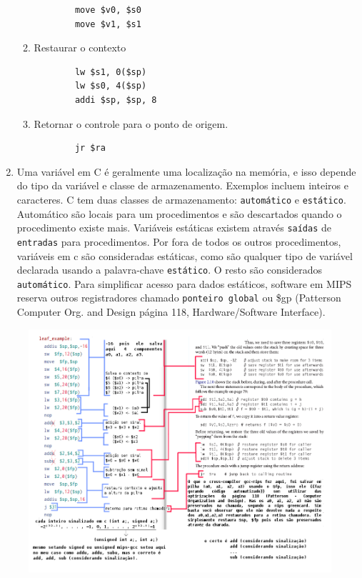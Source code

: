 \documentclass{article}
\begin{document}
\begin{enumerate}
\begin{enumerate}
      \begin{verbatim}
        move $v0, $s0
        move $v1, $s1
      \end{verbatim}

    \item Restaurar o contexto

      \begin{verbatim}
        lw $s1, 0($sp)
        lw $s0, 4($sp)
        addi $sp, $sp, 8
      \end{verbatim}

    \item Retornar o controle para o ponto de origem.

      \begin{verbatim}
        jr $ra
      \end{verbatim}

  \end{enumerate}

  \item Uma variável em C é geralmente uma localização na memória, e isso
  depende do tipo da variável e classe de armazenamento. Exemplos incluem
  inteiros e caracteres. C tem duas classes de armazenamento: \verb|automático|
  e \verb|estático|. Automático são locais para um procedimentos e são
  descartados quando o procedimento existe mais. Variáveis estáticas existem
  através \verb|saídas| de \verb|entradas| para procedimentos. Por fora de
  todos os outros procedimentos, variáveis em c são consideradas estáticas,
  como são qualquer tipo de variável declarada usando a palavra-chave
  \verb|estático|. O resto são considerados \verb|automático|. Para simplificar
  acesso para dados estáticos, software em MIPS reserva outros registradores
  chamado \verb|ponteiro global| ou  \$gp (Patterson Computer Org. and Design
  página 118, Hardware/Software Interface).

\end{enumerate}

\pagebreak
\begin{figure}[ht!]
  \centering
  \includegraphics[width=\linewidth]{leaf_example.png}
\end{figure}
\end{document}

